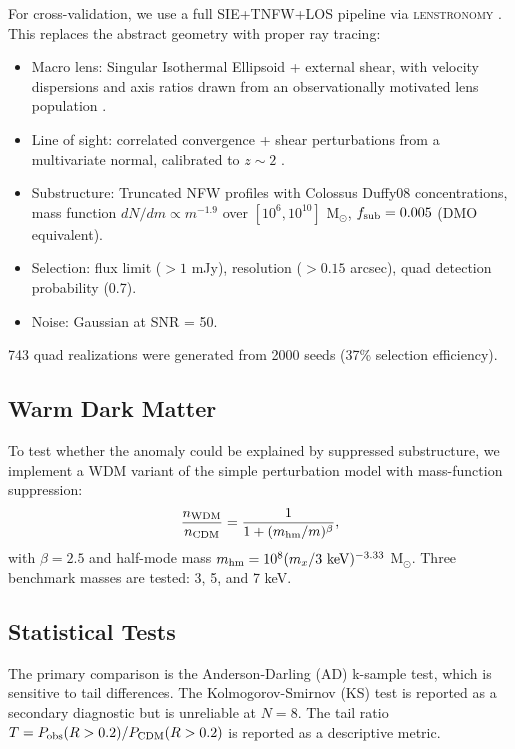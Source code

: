 \documentclass[12pt]{article}
\begin{document}
For cross-validation, we use a full SIE+TNFW+LOS pipeline via \textsc{lenstronomy}
\cite{lenstronomy}. This replaces the abstract geometry with proper ray tracing:
\begin{itemize}
\item Macro lens: Singular Isothermal Ellipsoid + external shear,
with velocity dispersions and axis ratios drawn from an observationally
motivated lens population \cite{Collett2015}.
\item Line of sight: correlated convergence + shear perturbations
from a multivariate normal, calibrated to $z \sim 2$ \cite{Hezaveh2016}.
\item Substructure: Truncated NFW profiles with Colossus Duffy08
concentrations, mass function $dN/dm \propto m^{-1.9}$ over
$[10^6, 10^{10}]$ M$_\odot$, $f_{\rm sub} = 0.005$ (DMO equivalent).
\item Selection: flux limit ($>1$ mJy), resolution ($>0.15$ arcsec),
quad detection probability (0.7).
\item Noise: Gaussian at SNR = 50.
\end{itemize}
743 quad realizations were generated from 2000 seeds (37\% selection efficiency).

\clearpage
\subsection{Warm Dark Matter}
\label{sec:wdm}

To test whether the anomaly could be explained by suppressed substructure,
we implement a WDM variant of the simple perturbation model with
mass-function suppression:
\begin{equation}
\frac{n_{\rm WDM}}{n_{\rm CDM}} = \frac{1}{1 + (m_{\rm hm}/m)^\beta},
\end{equation}
with $\beta = 2.5$ and half-mode mass
$m_{\rm hm} = 10^8 (m_x / 3\ {\rm keV})^{-3.33}$ M$_\odot$.
Three benchmark masses are tested: 3, 5, and 7 keV.

\subsection{Statistical Tests}
\label{sec:stats_tests}

The primary comparison is the Anderson-Darling (AD) k-sample test,
which is sensitive to tail differences. The Kolmogorov-Smirnov (KS)
test is reported as a secondary diagnostic but is unreliable at $N=8$.
The tail ratio $T = P_{\rm obs}(R > 0.2) / P_{\rm CDM}(R > 0.2)$
is reported as a descriptive metric.
\end{document}
